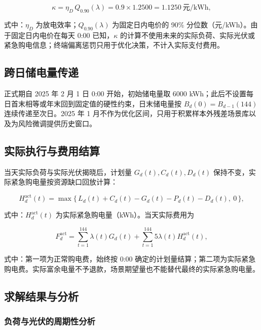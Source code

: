 \begin{equation}
  \kappa = \eta_D\, Q_{0.90}(\lambda) = 0.9 \times 1.2500 = 1.1250\ \text{元/kWh},
  \label{eq:kappa}
\end{equation}

式中：$\eta_D$ 为放电效率；$Q_{0.90}(\lambda)$ 为固定日内电价的 90\% 分位数（元/kWh）。由于固定日内电价在每天 0:00 已知，$\kappa$ 的计算不使用未来的实际负荷、实际光伏或紧急购电信息；终端偏离惩罚只用于优化决策，不计入实际支付费用。

\subsection{跨日储电量传递}

正式期自 2025 年 2 月 1 日 0:00 开始，初始储电量取 6000 kWh；此后不设置每日首末相等或年末回到固定值的硬性约束，日末储电量按 $B_d(0) = B_{d-1}(144)$ 连续传递至次日。2025 年 1 月不作为优化区间，只用于积累样本外残差场景库以及为风险微调提供历史窗口。

\subsection{实际执行与费用结算}

当天实际负荷与实际光伏揭晓后，计划量 $G_d(t),C_d(t),D_d(t)$ 保持不变，实际紧急购电量按资源缺口回放计算：

\begin{equation}
  H_d^{\mathrm{act}}(t) = \max\{\, L_d(t) + C_d(t) - G_d(t) - P_d(t) - D_d(t),\ 0 \,\},
  \label{eq:q2_actual}
\end{equation}

式中：$H_d^{\mathrm{act}}(t)$ 为实际紧急购电量（kWh）。当天实际费用为

\begin{equation}
  F_d^{\mathrm{act}} = \sum_{t=1}^{144} \lambda(t) G_d(t) + \sum_{t=1}^{144} 5\lambda(t) H_d^{\mathrm{act}}(t),
  \label{eq:q2_cost}
\end{equation}

式中：第一项为正常购电费，始终按 0:00 确定的计划量结算；第二项为实际紧急购电费。实际富余电量不予退款，场景期望量也不能替代最终的实际紧急购电量。

\subsection{求解结果与分析}

\subsubsection{负荷与光伏的周期性分析}

